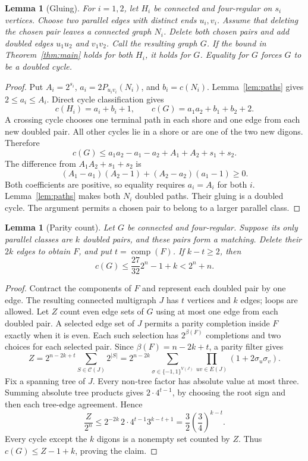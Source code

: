 \documentclass[11pt]{article}
\newtheorem{lemma}[theorem]{Lemma}
\newcommand{\Cyc}{\mathcal C}
\DeclareMathOperator{\comp}{comp}
\begin{document}
\begin{lemma}[Gluing]\label{lem:gluing}
For $i=1,2$, let $H_i$ be connected and four-regular on $s_i$ vertices.
Choose two parallel edges with distinct ends $u_i,v_i$.
Assume that deleting the chosen pair leaves a connected graph $N_i$.
Delete both chosen pairs and add doubled edges $u_1u_2$ and $v_1v_2$.
Call the resulting graph $G$.
If the bound in Theorem~\ref{thm:main} holds for both $H_i$, it holds for $G$.
Equality for $G$ forces $G$ to be a doubled cycle.
\end{lemma}

\begin{proof}
Put $A_i=2^{s_i}$, $a_i=2P_{u_iv_i}(N_i)$, and $b_i=c(N_i)$.
Lemma~\ref{lem:paths} gives $2\le a_i\le A_i$.
Direct cycle classification gives
\[
 c(H_i)=a_i+b_i+1,\qquad c(G)=a_1a_2+b_1+b_2+2.
\]
A crossing cycle chooses one terminal path in each shore and one edge from each new doubled pair.
All other cycles lie in a shore or are one of the two new digons.
Therefore
\[
 c(G)\le a_1a_2-a_1-a_2+A_1+A_2+s_1+s_2.
\]
The difference from $A_1A_2+s_1+s_2$ is
\[
 (A_1-a_1)(A_2-1)+(A_2-a_2)(a_1-1)\ge0.
\]
Both coefficients are positive, so equality requires $a_i=A_i$ for both $i$.
Lemma~\ref{lem:paths} makes both $N_i$ doubled paths.
Their gluing is a doubled cycle.
The argument permits a chosen pair to belong to a larger parallel class.
\end{proof}

\begin{lemma}[Parity count]\label{lem:parity}
Let $G$ be connected and four-regular.
Suppose its only parallel classes are $k$ doubled pairs, and these pairs form a matching.
Delete their $2k$ edges to obtain $F$, and put $t=\comp(F)$.
If $k-t\ge2$, then
\[
 c(G)\le\frac{27}{32}2^n-1+k<2^n+n.
\]
\end{lemma}

\begin{proof}
Contract the components of $F$ and represent each doubled pair by one edge.
The resulting connected multigraph $J$ has $t$ vertices and $k$ edges; loops are allowed.
Let $Z$ count even edge sets of $G$ using at most one edge from each doubled pair.
A selected edge set of $J$ permits a parity completion inside $F$ exactly when it is even.
Each such selection has $2^{\beta(F)}$ completions and two choices for each selected pair.
Since $\beta(F)=n-2k+t$, a parity filter gives
\[
 Z=2^{n-2k+t}\sum_{S\in\Cyc(J)}2^{|S|}
  =2^{n-2k}\sum_{\sigma\in\{-1,1\}^{V(J)}}
       \prod_{uv\in E(J)}(1+2\sigma_u\sigma_v).
\]
Fix a spanning tree of $J$.
Every non-tree factor has absolute value at most three.
Summing absolute tree products gives $2\cdot4^{t-1}$, by choosing the root sign and then each tree-edge agreement.
Hence
\[
 \frac Z{2^n}\le2^{-2k}\,2\cdot4^{t-1}3^{k-t+1}
       =\frac32\left(\frac34\right)^{k-t}.
\]
Every cycle except the $k$ digons is a nonempty set counted by $Z$.
Thus $c(G)\le Z-1+k$, proving the claim.
\end{proof}
\end{document}
